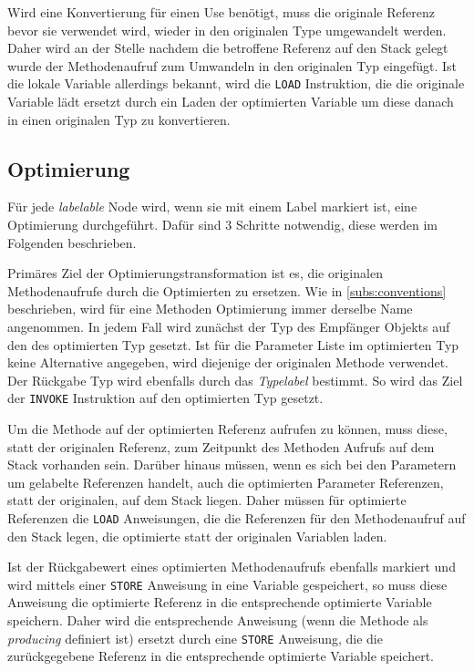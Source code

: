 Wird eine Konvertierung für einen Use benötigt, muss die originale Referenz bevor sie verwendet wird, wieder in
den originalen Type umgewandelt werden. Daher wird an der Stelle nachdem die betroffene Referenz auf den Stack
gelegt wurde der Methodenaufruf zum Umwandeln in den originalen Typ eingefügt. Ist die lokale Variable 
allerdings bekannt, wird die \texttt{LOAD} Instruktion, die die originale Variable lädt ersetzt durch ein
Laden der optimierten Variable um diese danach in einen originalen Typ zu konvertieren. 

\subsection{Optimierung}

Für jede \textit{labelable} Node wird, wenn sie mit einem Label markiert ist, eine Optimierung durchgeführt. 
Dafür sind 3 Schritte notwendig, diese werden im Folgenden beschrieben.

Primäres Ziel der Optimierungstransformation ist es, die originalen Methodenaufrufe durch die Optimierten zu 
ersetzen. Wie in \ref{subs:conventions} beschrieben, wird für eine Methoden Optimierung immer derselbe Name 
angenommen. In jedem Fall wird zunächst der Typ des Empfänger Objekts auf den des optimierten Typ gesetzt. 
Ist für die Parameter Liste im optimierten Typ keine Alternative angegeben, wird diejenige der originalen 
Methode verwendet. Der Rückgabe Typ wird ebenfalls durch das \textit{Typelabel} bestimmt. So wird das Ziel der 
\texttt{INVOKE} Instruktion auf den optimierten Typ gesetzt.

Um die Methode auf der optimierten Referenz aufrufen zu können, muss diese, statt der originalen Referenz, zum
Zeitpunkt des Methoden Aufrufs auf dem Stack vorhanden sein. Darüber hinaus müssen, wenn es sich bei den 
Parametern um gelabelte Referenzen handelt, auch die optimierten Parameter Referenzen, statt der originalen, 
auf dem Stack liegen. Daher müssen für optimierte Referenzen die \texttt{LOAD} Anweisungen, die die Referenzen
für den Methodenaufruf auf den Stack legen, die optimierte statt der originalen Variablen laden.

Ist der Rückgabewert eines optimierten Methodenaufrufs ebenfalls markiert und wird mittels einer 
\texttt{STORE} Anweisung in eine Variable gespeichert, so muss diese Anweisung die optimierte Referenz 
in die entsprechende optimierte Variable speichern. Daher wird die entsprechende Anweisung 
(wenn die Methode als \textit{producing} definiert ist) ersetzt durch eine \texttt{STORE} Anweisung, die 
die zurückgegebene Referenz in die entsprechende optimierte Variable speichert.

